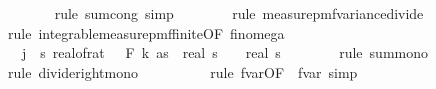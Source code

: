 \begin{isabellebody}
\ \ \ \ \ \ \isamarkupfalse%
\ {\isacharparenleft}{\kern0pt}rule\ sum{\isachardot}{\kern0pt}cong{\isacharcomma}{\kern0pt}\ simp{\isacharparenright}{\kern0pt}\isanewline
\ \ \ \ \ \ \isamarkupfalse%
\ {\isacharparenleft}{\kern0pt}rule\ measure{\isacharunderscore}{\kern0pt}pmf{\isachardot}{\kern0pt}variance{\isacharunderscore}{\kern0pt}divide{\isacharparenright}{\kern0pt}\isanewline
\ \ \ \ \ \ \isamarkupfalse%
\ {\isacharparenleft}{\kern0pt}rule\ integrable{\isacharunderscore}{\kern0pt}measure{\isacharunderscore}{\kern0pt}pmf{\isacharunderscore}{\kern0pt}finite{\isacharbrackleft}{\kern0pt}OF\ fin{\isacharunderscore}{\kern0pt}omega{\isacharunderscore}{\kern0pt}{}{\isacharbrackright}{\kern0pt}{\isacharparenright}{\kern0pt}\isanewline
\ \ \ \ \isamarkupfalse%
\ \isamarkupfalse%
\ {\isachardoublequoteopen}{\isachardot}{\kern0pt}{\isachardot}{\kern0pt}{\isachardot}{\kern0pt}\ {\isasymle}\ {\isacharparenleft}{\kern0pt}{\isasymSum}j\ {\isacharequal}{\kern0pt}\ {}{\isachardot}{\kern0pt}{\isachardot}{\kern0pt}{\isacharless}{\kern0pt}s\ {\isacharparenleft}{\kern0pt}{\isacharparenleft}{\kern0pt}real{\isacharunderscore}{\kern0pt}of{\isacharunderscore}{\kern0pt}rat\ {\isacharparenleft}{\kern0pt}{\isasymdelta}\ {\isacharasterisk}{\kern0pt}\ F\ k\ as{\isacharparenright}{\kern0pt}{\isacharparenright}{\kern0pt}\ {\isacharasterisk}{\kern0pt}\ real\ s\ {\isacharslash}{\kern0pt}\ {}{\isacharparenright}{\kern0pt}\ {\isacharslash}{\kern0pt}\ {\isacharparenleft}{\kern0pt}real\ s\isanewline
\ \ \ \ \ \ \isamarkupfalse%
\ {\isacharparenleft}{\kern0pt}rule\ sum{\isacharunderscore}{\kern0pt}mono{\isacharparenright}{\kern0pt}\isanewline
\ \ \ \ \ \ \isamarkupfalse%
\ {\isacharparenleft}{\kern0pt}rule\ divide{\isacharunderscore}{\kern0pt}right{\isacharunderscore}{\kern0pt}mono{\isacharparenright}{\kern0pt}\ \isanewline
\ \ \ \ \ \ \ \isamarkupfalse%
\ {\isacharparenleft}{\kern0pt}rule\ f{}{\isacharunderscore}{\kern0pt}var{\isacharbrackleft}{\kern0pt}OF\ {\isacharunderscore}{\kern0pt}\ f{}{\isacharunderscore}{\kern0pt}var{\isacharunderscore}{\kern0pt}{}{\isacharbrackright}{\kern0pt}{\isacharcomma}{\kern0pt}\ simp{\isacharparenright}{\kern0pt}\isanewline

\end{isabellebody}
